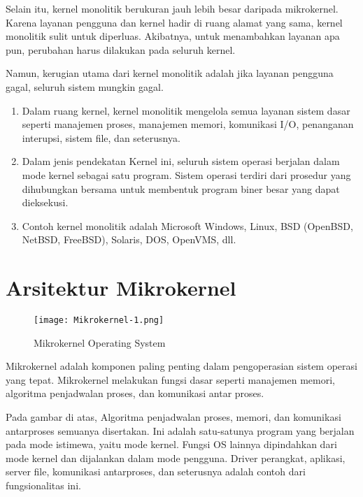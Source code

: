 	Selain itu, kernel monolitik berukuran jauh lebih besar daripada mikrokernel. Karena layanan pengguna dan kernel hadir di ruang alamat yang sama, kernel monolitik sulit untuk diperluas. Akibatnya, untuk menambahkan layanan apa pun, perubahan harus dilakukan pada seluruh kernel.
	
	Namun, kerugian utama dari kernel monolitik adalah jika layanan pengguna gagal, seluruh sistem mungkin gagal.
	
	\begin{enumerate}
		\item Dalam ruang kernel, kernel monolitik mengelola semua layanan sistem dasar seperti manajemen proses, manajemen memori, komunikasi I/O, penanganan interupsi, sistem file, dan seterusnya.
		
		\item Dalam jenis pendekatan Kernel ini, seluruh sistem operasi berjalan dalam mode kernel sebagai satu program. Sistem operasi terdiri dari prosedur yang dihubungkan bersama untuk membentuk program biner besar yang dapat dieksekusi.
		
		\item Contoh kernel monolitik adalah Microsoft Windows, Linux, BSD (OpenBSD, NetBSD, FreeBSD), Solaris, DOS, OpenVMS, dll.
	\end{enumerate}

	\vskip0.5cm

	\section*{Arsitektur Mikrokernel}

	\begin{figure}
		\centering
		\texttt{[image: Mikrokernel-1.png]}
		\caption{Mikrokernel Operating System}
	\end{figure}
	
	Mikrokernel adalah komponen paling penting dalam pengoperasian sistem operasi yang tepat. Mikrokernel melakukan fungsi dasar seperti manajemen memori, algoritma penjadwalan proses, dan komunikasi antar proses.
	
	Pada gambar di atas, Algoritma penjadwalan proses, memori, dan komunikasi antarproses semuanya disertakan. Ini adalah satu-satunya program yang berjalan pada mode istimewa, yaitu mode kernel. Fungsi OS lainnya dipindahkan dari mode kernel dan dijalankan dalam mode pengguna. Driver perangkat, aplikasi, server file, komunikasi antarproses, dan seterusnya adalah contoh dari fungsionalitas ini.
	
